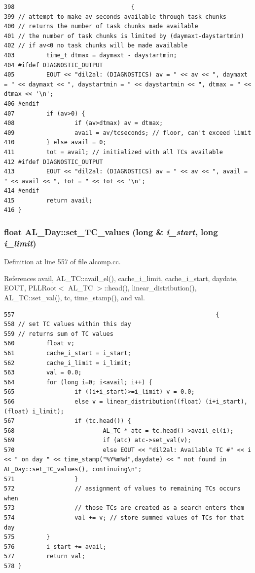 \footnotesize\begin{verbatim}398                                 {
399 // attempt to make av seconds available through task chunks
400 // returns the number of task chunks made available
401 // the number of task chunks is limited by (daymaxt-daystartmin)
402 // if av<0 no task chunks will be made available
403         time_t dtmax = daymaxt - daystartmin;
404 #ifdef DIAGNOSTIC_OUTPUT
405         EOUT << "dil2al: (DIAGNOSTICS) av = " << av << ", daymaxt = " << daymaxt << ", daystartmin = " << daystartmin << ", dtmax = " << dtmax << '\n';
406 #endif
407         if (av>0) {
408                 if (av>dtmax) av = dtmax;
409                 avail = av/tcseconds; // floor, can't exceed limit
410         } else avail = 0;
411         tot = avail; // initialized with all TCs available
412 #ifdef DIAGNOSTIC_OUTPUT
413         EOUT << "dil2al: (DIAGNOSTICS) av = " << av << ", avail = " << avail << ", tot = " << tot << '\n';
414 #endif
415         return avail;
416 }
\end{verbatim}\normalsize 
{}
\subsubsection{\setlength{\rightskip}{0pt plus 5cm}float AL\_\-Day::set\_\-TC\_\-values (long \& {\em i\_\-start}, long {\em i\_\-limit})}\label{classAL__Day_a20}




Definition at line 557 of file alcomp.cc.

References avail, AL\_\-TC::avail\_\-el(), cache\_\-i\_\-limit, cache\_\-i\_\-start, daydate, EOUT, PLLRoot$<$ AL\_\-TC $>$::head(), linear\_\-distribution(), AL\_\-TC::set\_\-val(), tc, time\_\-stamp(), and val.



\footnotesize\begin{verbatim}557                                                         {
558 // set TC values within this day
559 // returns sum of TC values
560         float v;
561         cache_i_start = i_start;
562         cache_i_limit = i_limit;
563         val = 0.0;
564         for (long i=0; i<avail; i++) {
565                 if ((i+i_start)>=i_limit) v = 0.0;
566                 else v = linear_distribution((float) (i+i_start), (float) i_limit);
567                 if (tc.head()) {
568                         AL_TC * atc = tc.head()->avail_el(i);
569                         if (atc) atc->set_val(v);
570                         else EOUT << "dil2al: Available TC #" << i << " on day " << time_stamp("%Y%m%d",daydate) << " not found in AL_Day::set_TC_values(), continuing\n";
571                 }
572                 // assignment of values to remaining TCs occurs when
573                 // those TCs are created as a search enters them
574                 val += v; // store summed values of TCs for that day
575         }
576         i_start += avail;
577         return val;
578 }
\end{verbatim}\normalsize 
{}
